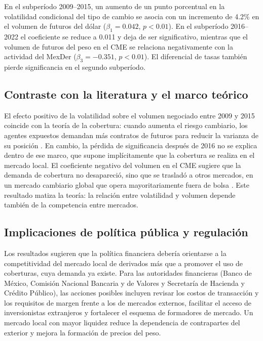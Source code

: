 En el subperíodo 2009–2015, un aumento de un punto porcentual en la volatilidad condicional del tipo de cambio se asocia con un incremento de 4.2\% en el volumen de futuros del dólar ($\beta_1 = 0.042$, $p < 0.01$). En el subperíodo 2016–2022 el coeficiente se reduce a 0.011 y deja de ser significativo, mientras que el volumen de futuros del peso en el CME se relaciona negativamente con la actividad del MexDer ($\beta_3 = -0.351$, $p < 0.01$). El diferencial de tasas también pierde significancia en el segundo subperíodo.

\subsection{Contraste con la literatura y el marco teórico}


El efecto positivo de la volatilidad sobre el volumen negociado entre 2009 y 2015 coincide con la teoría de la cobertura: cuando aumenta el riesgo cambiario, los agentes expuestos demandan más contratos de futuros para reducir la varianza de su posición \parencite{johnson1960,ederington1979}. En cambio, la pérdida de significancia después de 2016 no se explica dentro de ese marco, que supone implícitamente que la cobertura se realiza en el mercado local. El coeficiente negativo del volumen en el CME sugiere que la demanda de cobertura no desapareció, sino que se trasladó a otros mercados, en un mercado cambiario global que opera mayoritariamente fuera de bolsa \parencite{bis2022}. Este resultado matiza la teoría: la relación entre volatilidad y volumen depende también de la competencia entre mercados.

\subsection{Implicaciones de política pública y regulación}


Los resultados sugieren que la política financiera debería orientarse a la competitividad del mercado local de derivados más que a promover el uso de coberturas, cuya demanda ya existe. Para las autoridades financieras (Banco de México, Comisión Nacional Bancaria y de Valores y Secretaría de Hacienda y Crédito Público), las acciones posibles incluyen revisar los costos de transacción y los requisitos de margen frente a los de mercados externos, facilitar el acceso de inversionistas extranjeros y fortalecer el esquema de formadores de mercado. Un mercado local con mayor liquidez reduce la dependencia de contrapartes del exterior y mejora la formación de precios del peso.

